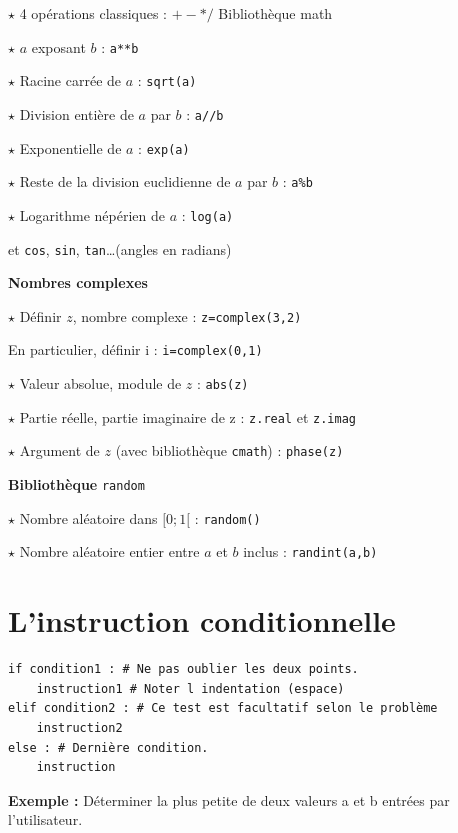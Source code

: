 $\star$ 4 opérations classiques : $+ - * /$ Bibliothèque math

$\star$ $a$ exposant $b$ : \verb!a**b! 

$\star$ Racine carrée de $a$ : \verb!sqrt(a)!

$\star$ Division entière de $a$ par $b$ : \verb!a//b !

$\star$ Exponentielle de $a$ : \verb!exp(a)!

$\star$ Reste de la division euclidienne de $a$ par $b$ : \verb!a%b!

$\star$ Logarithme népérien de $a$ : \verb!log(a)!

et \verb!cos!, \verb!sin!, \verb!tan!\dots (angles en radians)

\medskip

\textbf{Nombres complexes}

$\star$ Définir $z$, nombre complexe : \verb!z=complex(3,2)!

En particulier, définir i : \verb!i=complex(0,1)!

$\star$ Valeur absolue, module de $z$ : \verb!abs(z)!

$\star$ Partie réelle, partie imaginaire de z :
\verb!z.real! et \verb!z.imag!

$\star$ Argument de $z$ (avec bibliothèque \verb!cmath!) :
\verb!phase(z)!

\medskip

\textbf{Bibliothèque} \verb!random!

$\star$ Nombre aléatoire dans $[0; 1[$ : \verb!random()!

$\star$ Nombre aléatoire entier entre $a$ et $b$ inclus :
\verb!randint(a,b)!





\section{L'instruction conditionnelle}

\begin{lstlisting}
if condition1 : # Ne pas oublier les deux points.
	instruction1 # Noter l indentation (espace)
elif condition2 : # Ce test est facultatif selon le problème
	instruction2
else : # Dernière condition.
	instruction
\end{lstlisting}


\textbf{\large Exemple :} Déterminer la plus petite de deux valeurs a et b entrées par l'utilisateur.

